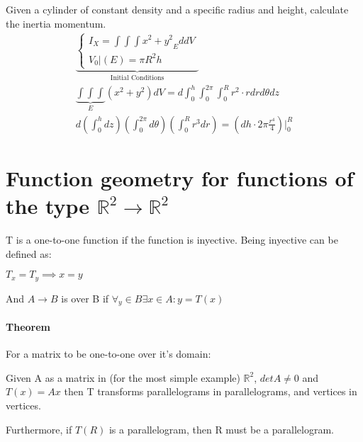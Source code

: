 \documentclass[11pt,fleqn]{book} %
\begin{document}
\begin{example}
    Given a cylinder of constant density and a specific radius and height, calculate the inertia momentum.
    \begin{gather}
    \underbrace{
        \begin{cases}
            I_X = \int{\int{\int{x^2 + y^2}}}_{E} d dV\\
            V_0 | (E) = \pi R^2 h        
        \end{cases}}_{\text{Initial Conditions}}\\
        \underbrace{\int \int \int}_{E} (x^2 + y^2) dV = d \int_{0}^h \int_{0}^{2 \pi} \int_{0}^R r^2 \cdot r dr d\theta dz\\
        d (\int_{0}^h dz) (\int_{0}^{2 \pi} d\theta) (\int_{0}^R r^3 dr) = (dh \cdot 2\pi \frac{r^4}{4})|_{0}^{R}
    \end{gather}
\end{example}

\section{Function geometry for functions of the type $\mathbb{R}^2 \to \mathbb{R}^2$}

T is a one-to-one function if the function is inyective. Being inyective can be defined as:

$T_x = T_y \implies x=y$

And $ A \to B $ is over B if $ \forall_y \in B \exists x \in A : y = T(x) $

\paragraph*{Theorem}
For a matrix to be one-to-one over it's domain:

Given A as a matrix in (for the most simple example) $\mathbb{R}^2$, $det A \neq 0$ and $T(x) = Ax$ then T transforms parallelograms in parallelograms, and
vertices in vertices. 

Furthermore, if $T(R)$ is a parallelogram, then R must be a parallelogram.
\end{document}
